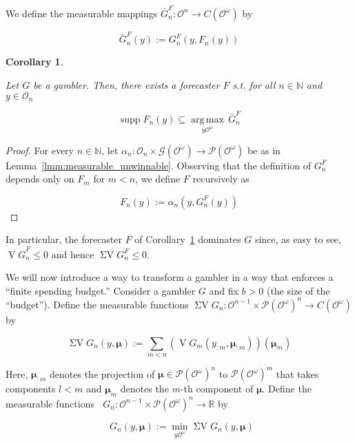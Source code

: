 \documentclass[11pt]{article}
\theoremstyle{definition}
\theoremstyle{plain}
\newtheorem{corollary}{Corollary}%
\newcommand{\Nats}{\mathbb{N}}
\newcommand{\Reals}{\mathbb{R}}
\newcommand{\Argmax}[1]{\underset{#1}{\operatorname{arg\,max}}\,}
\newcommand{\PM}{\mathcal{P}}
\DeclareMathOperator{\Sp}{supp}
\newcommand{\Ob}{\mathcal{O}}
\newcommand{\OO}{\Ob^\omega}
\newcommand{\PMO}{\PM(\OO)}
\newcommand{\Gm}{\mathcal{G}}
\newcommand{\GMO}{\Gm(\OO)}
\newcommand{\CO}{C(\OO)}
\DeclareMathOperator{\V}{V}
\DeclareMathOperator{\SV}{\Sigma V}
\DeclareMathOperator{\SVM}{\Sigma V_{\min}}
\newcommand{\BM}{\bm{\mu}}
\begin{document}
We define the measurable mappings $\bar{G}^F_n: \Ob^n \rightarrow \CO$ by

\begin{equation}
\bar{G}^F_n(y) := G^F_n(y,F_n(y))
\end{equation}

\begin{corollary}
\label{crl:dominate_one}

Let $G$ be a gambler. Then, there exists a forecaster $F$ s.t. for all $n \in \Nats$ and $y \in \Ob_n$

\begin{equation}
\Sp F_n(y) \subseteq \Argmax{y\OO} \bar{G}^F_n
\end{equation}

\end{corollary}

\begin{proof}

For every $n \in \Nats$, let $\alpha_n: \Ob_n \times \GMO \rightarrow \PMO$ be as in Lemma~\ref{lmm:measurable_unwinnable}. Observing that the definition of $G^F_n$ depends only on $F_m$ for $m < n$, we define $F$ recursively as

\[F_n(y):=\alpha_n(y,G^F_n(y))\]

\end{proof}

In particular, the forecaster $F$ of Corollary~\ref{crl:dominate_one} dominates $G$ since, as easy to see, $\overline{\V G}^F_n \leq 0$ and hence $\SV G^F_n \leq 0$.

We will now introduce a way to transform a gambler in a way that enforces a \enquote{finite spending budget.} Consider a gambler $G$ and fix $b > 0$ (the size of the \enquote{budget}). Define the measurable functions $\SV G_n: \Ob^{n-1} \times \PMO^n  \rightarrow \CO$ by

\begin{equation}
\SV G_n(y,\BM) := \sum_{m < n} (\V G_m(y_{:m},\BM_{:m}))(\BM_m)
\end{equation}

Here, $\BM_{:m}$ denotes the projection of $\BM \in \PMO^n$ to $\PMO^m$ that takes components $l < m$ and $\BM_m$ denotes the $m$-th component of $\BM$. Define the measurable functions $\SVM G_n: \Ob^{n-1} \times \PMO^n  \rightarrow \Reals$ by

\begin{equation}
\SVM G_n(y,\BM) := \min_{y\OO}{\SV G_n(y,\BM)}
\end{equation}
\end{document}
